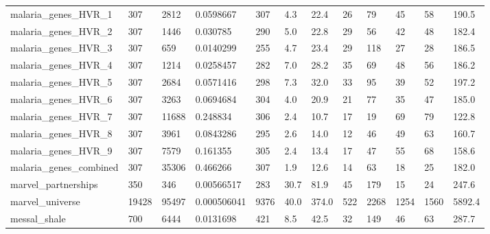 \begin{longtable}{llllllllllll}
 malaria\_genes\_HVR\_1                                & 307        & 2812      & 0.0598667   & 307   & 4.3    & 22.4   & 26    & 79     & 45     & 58     & 190.5   \\
 malaria\_genes\_HVR\_2                                & 307        & 1446      & 0.030785    & 290   & 5.0    & 22.8   & 29    & 56     & 42     & 48     & 182.4   \\
 malaria\_genes\_HVR\_3                                & 307        & 659       & 0.0140299   & 255   & 4.7    & 23.4   & 29    & 118    & 27     & 28     & 186.5   \\
 malaria\_genes\_HVR\_4                                & 307        & 1214      & 0.0258457   & 282   & 7.0    & 28.2   & 35    & 69     & 48     & 56     & 186.2   \\
 malaria\_genes\_HVR\_5                                & 307        & 2684      & 0.0571416   & 298   & 7.3    & 32.0   & 33    & 95     & 39     & 52     & 197.2   \\
 malaria\_genes\_HVR\_6                                & 307        & 3263      & 0.0694684   & 304   & 4.0    & 20.9   & 21    & 77     & 35     & 47     & 185.0   \\
 malaria\_genes\_HVR\_7                                & 307        & 11688     & 0.248834    & 306   & 2.4    & 10.7   & 17    & 19     & 69     & 79     & 122.8   \\
 malaria\_genes\_HVR\_8                                & 307        & 3961      & 0.0843286   & 295   & 2.6    & 14.0   & 12    & 46     & 49     & 63     & 160.7   \\
 malaria\_genes\_HVR\_9                                & 307        & 7579      & 0.161355    & 305   & 2.4    & 13.4   & 17    & 47     & 55     & 68     & 158.6   \\
 malaria\_genes\_combined                             & 307        & 35306     & 0.466266    & 307   & 1.9    & 12.6   & 14    & 63     & 18     & 25     & 182.0   \\
 marvel\_partnerships                                & 350        & 346       & 0.00566517  & 283   & 30.7   & 81.9   & 45    & 179    & 15     & 24     & 247.6   \\
 marvel\_universe                                    & 19428      & 95497     & 0.000506041 & 9376  & 40.0   & 374.0  & 522   & 2268   & 1254   & 1560   & 5892.4  \\
 messal\_shale                                       & 700        & 6444      & 0.0131698   & 421   & 8.5    & 42.5   & 32    & 149    & 46     & 63     & 287.7   \\

\end{longtable}
